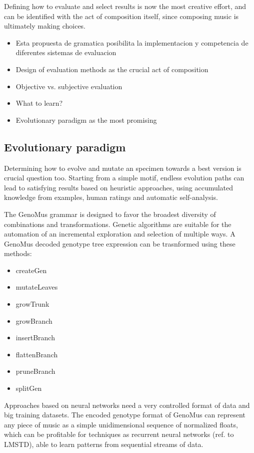 \documentclass{article}
\begin{document}
Defining how to evaluate and select results is now the most creative effort, and can be identified with the act of composition itself, since composing music is ultimately making choices. 


\begin{itemize}
\item Esta propuesta de gramatica posibilita la implementacion y competencia de diferentes sistemas de evaluacion
\item Design of evaluation methods as the crucial act of composition
\item Objective vs. subjective evaluation
\item What to learn?
\item Evolutionary paradigm as the most promising
\end{itemize}

\subsection{Evolutionary paradigm}

Determining how to evolve and mutate an specimen towards a best version is crucial question too. Starting from a simple motif, endless evolution paths can lead to satisfying results based on heuristic approaches, using accumulated knowledge from examples, human ratings and automatic self-analysis.

The GenoMus grammar is designed to favor the broadest diversity of combinations and transformations. Genetic algorithms are suitable for the automation of an incremental exploration and selection of multiple ways. A GenoMus decoded genotype tree expression can be trasnformed using these methods:

\begin{itemize}
\item createGen
\item mutateLeaves
\item growTrunk
\item growBranch
\item insertBranch
\item flattenBranch
\item pruneBranch
\item splitGen

\end{itemize}

Approaches based on neural networks need a very controlled format of data and big training datasets. The encoded genotype format of GenoMus can represent any piece of music as a simple unidimensional sequence of normalized floats, which can be profitable for techniques as recurrent neural networks (ref. to LMSTD), able to learn patterns from sequential streams of data.
\end{document}
